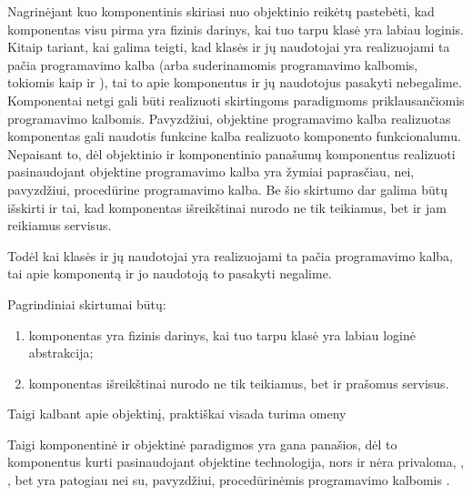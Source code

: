 Nagrinėjant kuo komponentinis skiriasi nuo objektinio reikėtų
pastebėti, kad komponentas visu pirma yra fizinis darinys, kai tuo
tarpu klasė yra labiau loginis. Kitaip tariant, kai galima teigti,
kad klasės ir jų naudotojai yra realizuojami ta pačia programavimo
kalba (arba suderinamomis programavimo kalbomis, tokiomis kaip
 ir ), tai to apie komponentus ir jų
naudotojus pasakyti nebegalime. Komponentai netgi gali būti realizuoti
skirtingoms paradigmoms priklausančiomis programavimo kalbomis.
Pavyzdžiui, objektine programavimo kalba realizuotas komponentas gali
naudotis funkcine kalba realizuoto komponento
funkcionalumu\cite[36]{heineman2001component}. Nepaisant to,
dėl objektinio ir komponentinio panašumų komponentus realizuoti
pasinaudojant objektine programavimo kalba yra žymiai paprasčiau,
nei, pavyzdžiui, procedūrine programavimo kalba\cite{what-to-compose}.
Be šio skirtumo dar galima būtų išskirti ir tai, kad komponentas
išreikštinai nurodo ne tik teikiamus, bet ir jam reikiamus
servisus.

Todėl kai klasės ir jų
naudotojai yra realizuojami ta pačia programavimo kalba, tai
apie komponentą ir jo naudotoją to pasakyti negalime.

Pagrindiniai skirtumai būtų:
\begin{enumerate}
  \item komponentas yra fizinis darinys, kai tuo tarpu klasė yra
    labiau loginė abstrakcija;
  \item komponentas išreikštinai nurodo ne tik teikiamus, bet ir
    prašomus servisus.
\end{enumerate}
Taigi kalbant apie objektinį, praktiškai visada turima omeny

Taigi komponentinė ir objektinė paradigmos yra gana panašios, dėl to
komponentus kurti pasinaudojant objektine technologija, nors ir nėra
privaloma\cite[389]{objects-components-and-frameworks-with-uml},
\cite[11]{cs-beyond-object-oriented-programming},
\cite[36]{heineman2001component}, bet yra patogiau nei su, pavyzdžiui,
procedūrinėmis programavimo kalbomis \cite{what-to-compose}.
